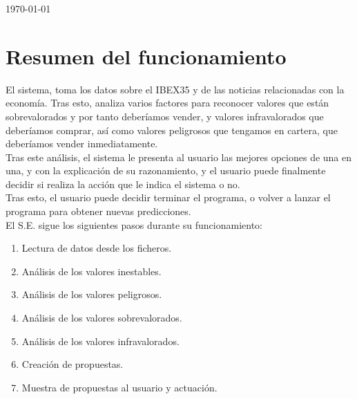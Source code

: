 \begin{titlepage}

{\large \today}\\[3cm] %


 

\vfill %

\end{titlepage}

\tableofcontents
\newpage

\section{Resumen del funcionamiento}

El sistema, toma los datos sobre el IBEX35 y de las noticias relacionadas con la economía. Tras esto, analiza varios factores para reconocer valores que están sobrevalorados y por tanto deberíamos vender, y valores infravalorados que deberíamos comprar, así como valores peligrosos que tengamos en cartera, que deberíamos vender inmediatamente.\\

Tras este análisis, el sistema le presenta al usuario las mejores opciones de una en una, y con la explicación de su razonamiento, y el usuario puede finalmente decidir si realiza la acción que le indica el sistema o no.\\

Tras esto, el usuario puede decidir terminar el programa, o volver a lanzar el programa para obtener nuevas predicciones.\\

El S.E. sigue los siguientes pasos durante su funcionamiento:

\begin{enumerate}
\item Lectura de datos desde los ficheros.
\item Análisis de los valores inestables.
\item Análisis de los valores peligrosos.
\item Análisis de los valores sobrevalorados.
\item Análisis de los valores infravalorados.
\item Creación de propuestas.
\item Muestra de propuestas al usuario y actuación.
\end{enumerate}
\newpage

